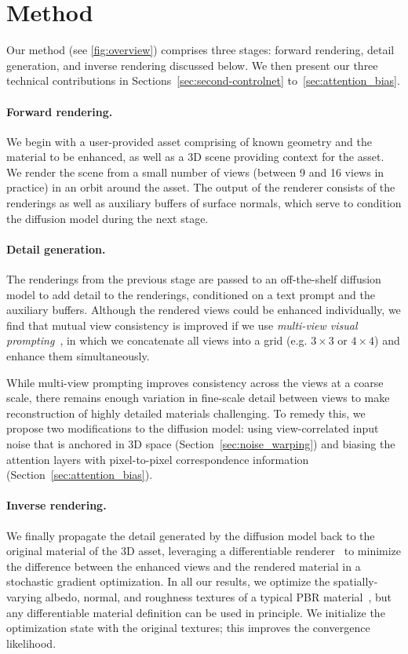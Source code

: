 \section{Method}
\label{sec:method}

Our method (see \autoref{fig:overview}) comprises three stages: forward rendering, detail generation, and inverse rendering discussed below. We then present our three technical contributions in Sections~\ref{sec:second-controlnet} to~\ref{sec:attention_bias}.


\paragraph{Forward rendering.}
We begin with a user-provided asset comprising of known geometry and the material to be enhanced, as well as a 3D scene providing context for the asset.
We render the scene from a small number of views (between 9 and 16 views in practice) in an orbit around the asset.
The output of the renderer consists of the renderings as well as auxiliary buffers of surface normals, which serve to condition the diffusion model during the next stage.

\paragraph{Detail generation.}

The renderings from the previous stage are passed to an off-the-shelf diffusion model to add detail to the renderings, conditioned on a text prompt and the auxiliary buffers. Although the rendered views could be enhanced individually, we find that mutual view consistency is improved if we use \emph{multi-view visual prompting}~\cite{flashtex}, in which we concatenate all views into a grid (e.g. $3\times 3$ or $4\times 4$) and enhance them simultaneously.






While multi-view prompting improves consistency across the views at a coarse scale, there remains enough variation in fine-scale detail between views to make reconstruction of highly detailed materials challenging.
To remedy this, we propose two modifications to the diffusion model:
using view-correlated input noise that is anchored in 3D space (Section~\ref{sec:noise_warping}) 
and biasing the attention layers with pixel-to-pixel correspondence information (Section~\ref{sec:attention_bias}).


\paragraph{Inverse rendering.}
We finally propagate the detail generated by the diffusion model back to the original material of the 3D asset, leveraging a differentiable renderer~\cite{mitsuba} to minimize the difference between the enhanced views and the rendered material in a stochastic gradient optimization.
In all our results, we optimize the spatially-varying albedo, normal, and roughness textures of a typical PBR material~\cite{Burley2012}, but any differentiable material definition can be used in principle.
We initialize the optimization state with the original textures; this improves the convergence likelihood. %

